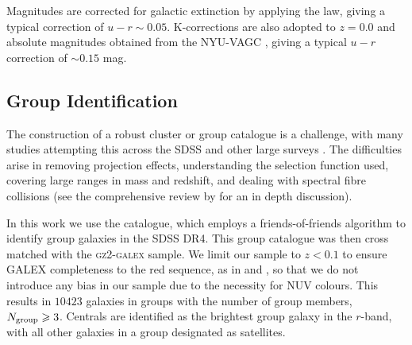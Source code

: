 \documentclass[useAMS,usenatbib]{mn2e}
\begin{document}
Magnitudes are corrected for galactic extinction \citep{Oh11} by applying the \citet{Cardelli89} law, giving a typical correction of $u-r \sim 0.05$. K-corrections are also adopted to $z=0.0$ and absolute magnitudes obtained from the NYU-VAGC \citep{Blanton05, padmanabhan08, blanton07}, giving a typical $u-r$ correction of $\sim 0.15$ mag. %



\subsection{Group Identification}\label{sec:groups}


The construction of a robust cluster or group catalogue is a challenge, with many studies attempting this across the SDSS \citep[e.g. ][]{merchan05, miller05, berlind06, yang07, tago08, tago10, tinker11, munoz12, tempel14} and other large surveys \citep{tucker00, merchan02, eke04, cucciati10, robotham11, knobel12}. The difficulties arise in removing projection effects, understanding the selection function used, covering large ranges in mass and redshift, and dealing with spectral fibre collisions (see the comprehensive review by \citealt{postman02} for an in depth discussion). 


In this work we use the \citet{berlind06} catalogue, which employs a friends-of-friends algorithm to identify group galaxies in the SDSS DR4. This group catalogue was then cross matched with the \textsc{gz2-galex} sample. We limit our sample to $z < 0.1$ to ensure GALEX completeness to the red sequence, as in \citealt{wyder07} and \citealt{yesuf14}, so that we do not introduce any bias in our sample due to the necessity for NUV colours. This results in $10423$ galaxies in groups with the number of group members, $N_{\rm{group}} \geq 3$. Centrals are identified as the brightest group galaxy in the $r$-band, with all other galaxies in a group designated as satellites.
\end{document}
